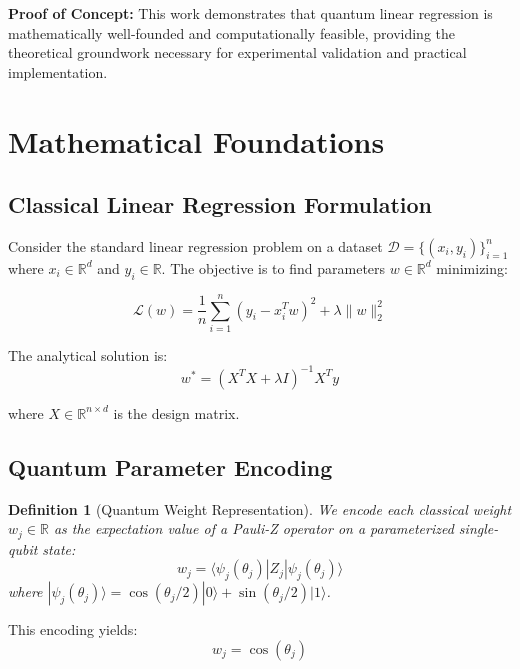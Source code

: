 \documentclass[11pt]{article}
\newtheorem{definition}[theorem]{Definition}
\newenvironment{concept}
{\begin{framed}
\noindent\textbf{Proof of Concept:} }
{\end{framed}}
\begin{document}
\begin{concept}
This work demonstrates that quantum linear regression is mathematically well-founded and computationally feasible, providing the theoretical groundwork necessary for experimental validation and practical implementation.
\end{concept}

\section{Mathematical Foundations}

\subsection{Classical Linear Regression Formulation}

Consider the standard linear regression problem on a dataset $\mathcal{D} = \{(x_i, y_i)\}_{i=1}^n$ where $x_i \in \mathbb{R}^d$ and $y_i \in \mathbb{R}$. The objective is to find parameters $w \in \mathbb{R}^d$ minimizing:

\begin{equation}
\mathcal{L}(w) = \frac{1}{n} \sum_{i=1}^n (y_i - x_i^T w)^2 + \lambda \|w\|_2^2
\label{eq:classical_loss}
\end{equation}

The analytical solution is:
\begin{equation}
w^* = (X^T X + \lambda I)^{-1} X^T y
\label{eq:classical_solution}
\end{equation}

where $X \in \mathbb{R}^{n \times d}$ is the design matrix.

\subsection{Quantum Parameter Encoding}

\begin{definition}[Quantum Weight Representation]
We encode each classical weight $w_j \in \mathbb{R}$ as the expectation value of a Pauli-Z operator on a parameterized single-qubit state:
\begin{equation}
w_j = \langle \psi_j(\theta_j) | Z_j | \psi_j(\theta_j) \rangle
\label{eq:quantum_weight}
\end{equation}
where $|\psi_j(\theta_j)\rangle = \cos(\theta_j/2)|0\rangle + \sin(\theta_j/2)|1\rangle$.
\end{definition}

This encoding yields:
\begin{equation}
w_j = \cos(\theta_j)
\label{eq:weight_function}
\end{equation}
\end{document}
